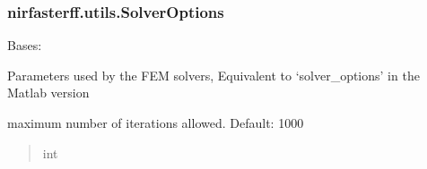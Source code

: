 \documentclass[letterpaper,10pt,english]{sphinxmanual}
\begin{document}
\sphinxstepscope


\subsubsection{nirfasterff.utils.SolverOptions}
\label{\detokenize{_autosummary/nirfasterff.utils.SolverOptions:nirfasterff-utils-solveroptions}}\label{\detokenize{_autosummary/nirfasterff.utils.SolverOptions::doc}}

\begin{fulllineitems}
\label{\detokenize{_autosummary/nirfasterff.utils.SolverOptions:nirfasterff.utils.SolverOptions}}
\pysigstartsignatures
{}
\pysigstopsignatures
\sphinxAtStartPar
Bases: 

\sphinxAtStartPar
Parameters used by the FEM solvers, Equivalent to ‘solver\_options’ in the Matlab version

\begin{fulllineitems}
\label{\detokenize{_autosummary/nirfasterff.utils.SolverOptions:nirfasterff.utils.SolverOptions.max_iter}}
\pysigstartsignatures
{}
\pysigstopsignatures
\sphinxAtStartPar
maximum number of iterations allowed. Default: 1000
\begin{quote}\begin{description}
\sphinxAtStartPar
int

\end{description}\end{quote}

\end{fulllineitems}


\end{fulllineitems}
\end{document}
